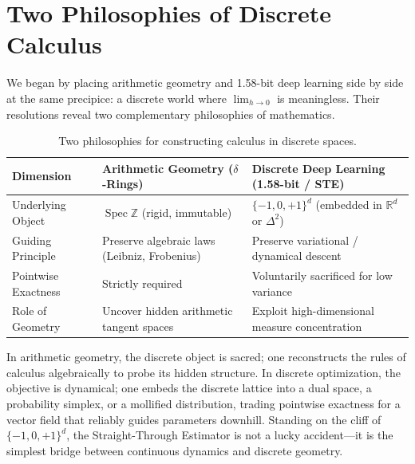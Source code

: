 \section{Two Philosophies of Discrete Calculus}

We began by placing arithmetic geometry and 1.58-bit deep learning side by side at the same precipice: a discrete world where $\lim_{h \to 0}$ is meaningless. Their resolutions reveal two complementary philosophies of mathematics.

\begin{table}[htbp]
\centering
\small
\begin{tabularx}{\linewidth}{@{}YYY@{}}
\toprule
\textbf{Dimension} & \textbf{Arithmetic Geometry ($\delta$-Rings)} & \textbf{Discrete Deep Learning (1.58-bit / STE)} \\
\midrule
Underlying Object & $\operatorname{Spec}\mathbb{Z}$ (rigid, immutable) & $\{-1, 0, +1\}^d$ (embedded in $\mathbb{R}^d$ or $\Delta^2$) \\
Guiding Principle & Preserve algebraic laws (Leibniz, Frobenius) & Preserve variational / dynamical descent \\
Pointwise Exactness & Strictly required & Voluntarily sacrificed for low variance \\
Role of Geometry & Uncover hidden arithmetic tangent spaces & Exploit high-dimensional measure concentration \\
\bottomrule
\end{tabularx}
\caption{Two philosophies for constructing calculus in discrete spaces.}
\end{table}

In arithmetic geometry, the discrete object is sacred; one reconstructs the rules of calculus algebraically to probe its hidden structure. In discrete optimization, the objective is dynamical; one embeds the discrete lattice into a dual space, a probability simplex, or a mollified distribution, trading pointwise exactness for a vector field that reliably guides parameters downhill. Standing on the cliff of $\{-1, 0, +1\}^d$, the Straight-Through Estimator is not a lucky accident—it is the simplest bridge between continuous dynamics and discrete geometry.

